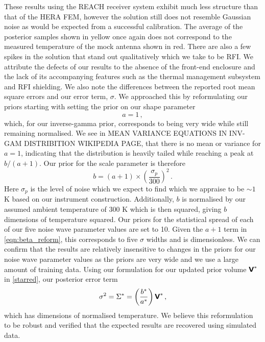 These results using the REACH receiver system exhibit much less structure than that of the HERA FEM, however the solution still does not resemble Gaussian noise as would be expected from a successful calibration. The average of the posterior samples shown in yellow once again does not correspond to the measured temperature of the mock antenna shown in red. There are also a few spikes in the solution that stand out qualitatively which we take to be RFI. We attribute the defects of our results to the absence of the front-end enclosure and the lack of its accompanying features such as the thermal management subsystem and RFI shielding. We also note the differences between the reported root mean square errors and our error term, $\sigma$. We approached this by reformulating our priors starting with setting the prior on our shape parameter
\begin{equation}
    a = 1 \,,
    \label{eqn:alpha_reform}
\end{equation}
which, for our inverse-gamma prior, corresponds to being very wide while still remaining normalised. We see in MEAN VARIANCE EQUATIONS IN INV-GAM DISTRIBITION WIKIPEDIA PAGE, that there is no mean or variance for $a=1$, indicating that the distribution is heavily tailed while reaching a peak at $b/(a + 1)$. Our prior for the scale parameter is therefore 
\begin{equation}
    b = \left(a + 1\right) \times \left(\frac{\sigma_{p}}{300}\right)^2 \,.
    \label{eqn:beta_reform}
\end{equation}
Here $\sigma_{p}$ is the level of noise which we expect to find which we appraise to be $\sim 1$ K based on our instrument construction. Additionally, $b$ is normalised by our assumed ambient temperature of 300 K which is then squared, giving $b$ dimensions of temperature squared. Our priors for the statistical spread of each of our five noise wave parameter values are set to 10. Given the $a + 1$ term in \cref{eqn:beta_reform}, this corresponds to five $\sigma$ widths and is dimensionless. We can confirm that the results are relatively insensitive to changes in the priors for our noise wave parameter values as the priors are very wide and we use a large amount of training data. Using our formulation for our updated prior volume $\textbf{\textsf{V}}^*$ in \cref{starred}, our posterior error term
\begin{equation}
    \sigma^2 = \Sigma^* = \left( \frac{b^*}{a^*} \right) \textbf{\textsf{V}}^* \,,
    \label{eqn:sigma_reform}
\end{equation}
which has dimensions of normalised temperature. We believe this reformulation to be robust and verified that the expected results are recovered using simulated data.

